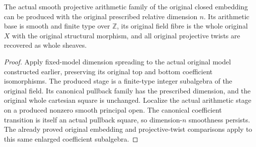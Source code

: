 \begin{theorem}
\label{thm:kn-arithmetic-original-dimension-family}
\leanok
{}
The actual smooth projective arithmetic family of the original closed
embedding can be produced with the original prescribed relative
dimension $n$. Its arithmetic base is smooth and finite type over
$\mathbb Z$, its original field fibre is the whole original $X$ with
the original structural morphism, and all original projective twists
are recovered as whole sheaves.
\end{theorem}
\begin{proof}
Apply fixed-model dimension spreading to the actual original model
constructed earlier, preserving its original top and bottom coefficient
isomorphisms. The produced stage is a finite-type integer subalgebra
of the original field. Its canonical pullback family has the
prescribed dimension, and the original whole cartesian square is
unchanged. Localize the actual arithmetic stage on a produced
nonzero smooth principal open. The canonical coefficient transition
is itself an actual pullback square, so dimension-$n$ smoothness
persists. The already proved original embedding and projective-twist
comparisons apply to this same enlarged coefficient subalgebra.
\end{proof}

